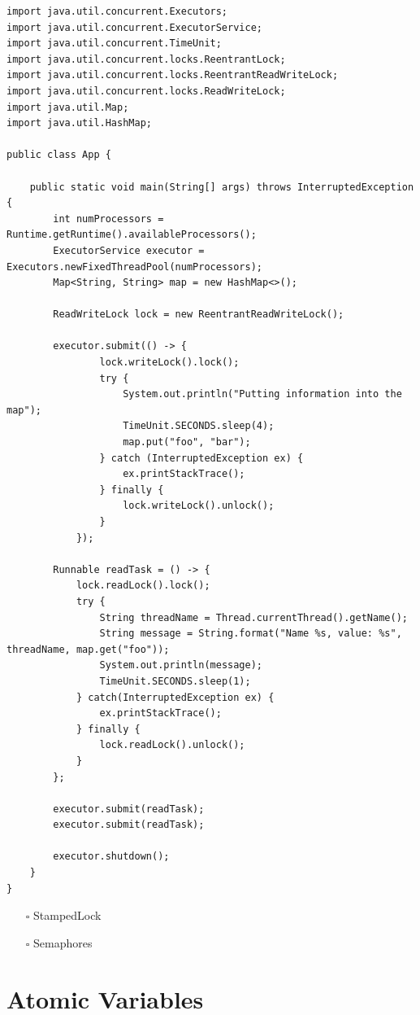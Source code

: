 \documentclass[openany, a4paper]{book}
\theoremstyle{break}
\theoremstyle{example}
\theoremstyle{note}
\theoremstyle{break}
\theoremstyle{exercise}
\begin{document}
\begin{verbatim}
import java.util.concurrent.Executors;
import java.util.concurrent.ExecutorService;
import java.util.concurrent.TimeUnit;
import java.util.concurrent.locks.ReentrantLock;
import java.util.concurrent.locks.ReentrantReadWriteLock;
import java.util.concurrent.locks.ReadWriteLock;
import java.util.Map;
import java.util.HashMap;

public class App {

    public static void main(String[] args) throws InterruptedException {
        int numProcessors = Runtime.getRuntime().availableProcessors();
        ExecutorService executor = Executors.newFixedThreadPool(numProcessors);
        Map<String, String> map = new HashMap<>();

        ReadWriteLock lock = new ReentrantReadWriteLock();

        executor.submit(() -> {
                lock.writeLock().lock();
                try {
                    System.out.println("Putting information into the map");
                    TimeUnit.SECONDS.sleep(4);
                    map.put("foo", "bar");
                } catch (InterruptedException ex) {
                    ex.printStackTrace();
                } finally {
                    lock.writeLock().unlock();
                }
            });

        Runnable readTask = () -> {
            lock.readLock().lock();
            try {
                String threadName = Thread.currentThread().getName();
                String message = String.format("Name %s, value: %s", threadName, map.get("foo"));
                System.out.println(message);
                TimeUnit.SECONDS.sleep(1);
            } catch(InterruptedException ex) {
                ex.printStackTrace();
            } finally {
                lock.readLock().unlock();
            }
        };

        executor.submit(readTask);
        executor.submit(readTask);

        executor.shutdown();
    }
}
\end{verbatim}

\begin{itemize}
\item[{$\square$}] StampedLock
\item[{$\square$}] Semaphores
\end{itemize}

\section{Atomic Variables}
\label{sec:org14825f6}
\end{document}
